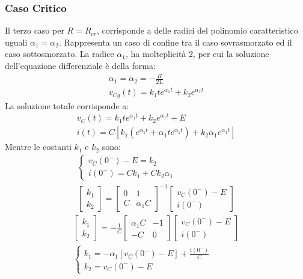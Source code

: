 \documentclass{article}
\numberwithin{equation}{subsection}
\begin{document}
\subsubsection{Caso Critico}
Il terzo caso per $R=R_{cr}$, corrisponde a delle radici del polinomio caratteristico uguali $\alpha_1=\alpha_2$. Rappresenta un caso di confine tra il caso 
sovrasmorzato ed il caso sottosmorzato. La radice $\alpha_1$, ha molteplicità $2$, per cui 
la soluzione dell'equazione differenziale è della forma:
\begin{gather*}
    \alpha_1=\alpha_2=\displaystyle-\frac{R}{2L}\\
    v_{Cg}(t)=k_1te^{\alpha_1t}+k_2e^{\alpha_1t}
\end{gather*}
La soluzione totale corrisponde a:
\begin{gather*}
    v_C(t)=k_1te^{\alpha_1t}+k_2e^{\alpha_1t}+E\\
    i(t)=C\left[k_1(e^{\alpha_1t}+\alpha_1te^{\alpha_1t})+k_2\alpha_1e^{\alpha_1t}\right]
\end{gather*}
Mentre le costanti $k_1$ e $k_2$ sono:
\begin{gather*}
    \begin{cases}
        v_C(0^-)-E=k_2\\
        i(0^-)=Ck_1+Ck_2\alpha_1
    \end{cases}\\
    \begin{bmatrix}
        k_1\\k_2
    \end{bmatrix}=\begin{bmatrix}
        0&1\\C&\alpha_1C
    \end{bmatrix}^{-1}\begin{bmatrix}
        v_C(0^-)-E\\i(0^-)
    \end{bmatrix}
\end{gather*}
\begin{gather*}
    \begin{bmatrix}
        k_1\\k_2
    \end{bmatrix}=\displaystyle-\frac{1}{C}\begin{bmatrix}
        \alpha_1C&-1\\-C&0
    \end{bmatrix}\begin{bmatrix}
        v_C(0^-)-E\\i(0^-)
    \end{bmatrix}\\
    \begin{cases}
        k_1=-\alpha_1[v_C(0^-)-E]+\displaystyle\frac{i(0^-)}{C}\\
        k_2=v_C(0^-)-E
    \end{cases}
\end{gather*}
\end{document}
